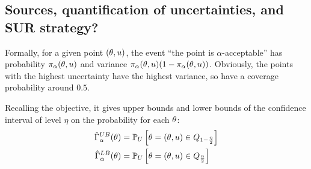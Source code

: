 \documentclass[../../Main_ManuscritThese.tex]{subfiles}
\newcommand{\IMSE}{\mathop{IMSE}}
\begin{document}




\subsection{Sources, quantification of uncertainties, and SUR strategy?}
Formally, for a given point $(\theta,u)$, the event ``the point is $\alpha$-acceptable'' has probability $\pi_{\alpha}(\theta,u)$ and variance $\pi_{\alpha}(\theta,u) (1-\pi_{\alpha}(\theta,u))$. Obviously, the points with the highest uncertainty have the highest variance, so have a coverage probability around $0.5$.


Recalling the objective, it gives upper bounds and lower bounds of the confidence interval of level $\eta$ on the probability for each $\theta$:
\begin{align}
  \hat{\Gamma}_{\alpha}^{UB}(\theta) &= \mathbb{P}_U\left[\theta=(\theta,u) \in Q_{1-\frac{\eta}{2}}\right] \\
  \hat{\Gamma}_{\alpha}^{LB}(\theta) &= \mathbb{P}_U\left[\theta=(\theta,u) \in Q_{\frac{\eta}{2}}\right]
\end{align}
\end{document}
